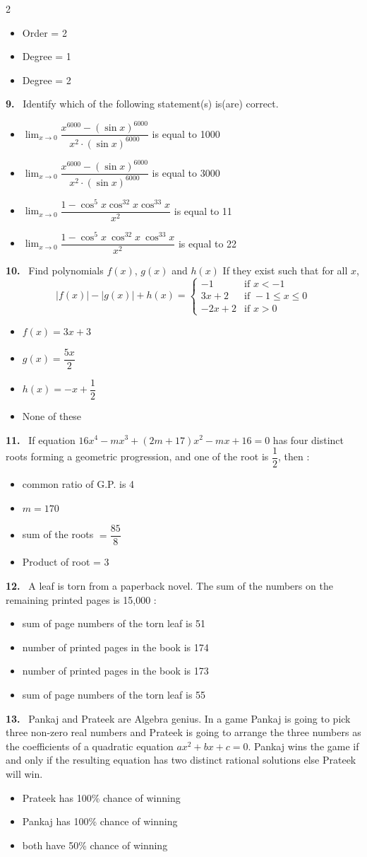 \documentclass[10pt]{extarticle}
\newcommand{\qn}[1]{\par\smallskip\noindent\textbf{#1.}~}
\newenvironment{qoptions}{\begin{itemize}[leftmargin=1.8em,itemsep=1pt,topsep=2pt,label={}]}{\end{itemize}}
\newcommand{\opt}[2]{\item[(#1)] #2}
\begin{document}
\begin{multicols}{2}
\begin{qoptions}
\opt{B}{Order = 2}
\opt{C}{Degree = 1}
\opt{D}{Degree = 2}
\end{qoptions}
\qn{9} Identify which of the following statement(s) is(are) correct.
\begin{qoptions}
\opt{A}{$\displaystyle\lim_{x\to0}\dfrac{x^{6000}-(\sin x)^{6000}}{x^2\cdot(\sin x)^{6000}}$ is equal to 1000}
\opt{B}{$\displaystyle\lim_{x\to0}\dfrac{x^{6000}-(\sin x)^{6000}}{x^2\cdot(\sin x)^{6000}}$ is equal to 3000}
\opt{C}{$\displaystyle\lim_{x\to0}\dfrac{1-\cos^5x\cos^32x\cos^33x}{x^2}$ is equal to 11}
\opt{D}{$\displaystyle\lim_{x\to0}\dfrac{1-\cos^5x\ \cos^32x\ \cos^33x}{x^2}$ is equal to 22}
\end{qoptions}
\qn{10} Find polynomials $f(x)$, $g(x)$ and $h(x)$ If they exist such that for all $x$,
\[|f(x)|-|g(x)|+h(x)=\begin{cases}-1&\text{if }x<-1\\3x+2&\text{if }-1\le x\le0\\-2x+2&\text{if }x>0\end{cases}\]
\begin{qoptions}
\opt{A}{$f(x)=3x+3$}
\opt{B}{$g(x)=\dfrac{5x}{2}$}
\opt{C}{$h(x)=-x+\dfrac12$}
\opt{D}{None of these}
\end{qoptions}
\qn{11} If equation $16x^4-mx^3+(2m+17)x^2-mx+16=0$ has four distinct roots forming a geometric progression, and one of the root is $\dfrac12$, then :
\begin{qoptions}
\opt{A}{common ratio of G.P. is 4}
\opt{B}{$m=170$}
\opt{C}{sum of the roots $=\dfrac{85}{8}$}
\opt{D}{Product of root = 3}
\end{qoptions}
\qn{12} A leaf is torn from a paperback novel. The sum of the numbers on the remaining printed pages is 15,000 :
\begin{qoptions}
\opt{A}{sum of page numbers of the torn leaf is 51}
\opt{B}{number of printed pages in the book is 174}
\opt{C}{number of printed pages in the book is 173}
\opt{D}{sum of page numbers of the torn leaf is 55}
\end{qoptions}
\qn{13} Pankaj and Prateek are Algebra genius. In a game Pankaj is going to pick three non-zero real numbers and Prateek is going to arrange the three numbers as the coefficients of a quadratic equation $ax^2+bx+c=0$. Pankaj wins the game if and only if the resulting equation has two distinct rational solutions else Prateek will win.
\begin{qoptions}
\opt{A}{Prateek has 100\% chance of winning}
\opt{B}{Pankaj has 100\% chance of winning}
\opt{C}{both have 50\% chance of winning}

\end{qoptions}
\end{multicols}
\end{document}
